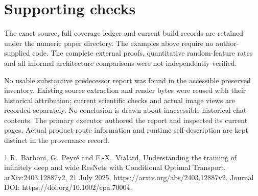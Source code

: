 \documentclass[10pt]{article}
\begin{document}
\section*{Supporting checks}
The exact source, full coverage ledger and current build records are retained under the numeric paper directory. The examples above require no author-supplied code. The complete external proofs, quantitative random-feature rates and all informal architecture comparisons were not independently verified.\par
No usable substantive predecessor report was found in the accessible preserved inventory. Existing source extraction and render bytes were reused with their historical attribution; current scientific checks and actual image views are recorded separately. No conclusion is drawn about inaccessible historical chat contents. The primary executor authored the report and inspected its current pages. Actual product-route information and runtime self-description are kept distinct in the provenance record.\par
1 R. Barboni, G. Peyré and F.-X. Vialard, Understanding the training of infinitely deep and wide ResNets with Conditional Optimal Transport, arXiv:2403.12887v2, 21 July 2025, https://arxiv.org/abs/2403.12887v2. Journal DOI: https://doi.org/10.1002/cpa.70004.\par
\end{document}
